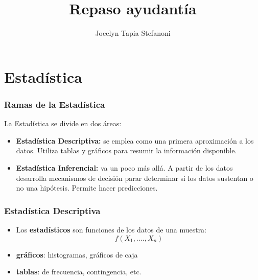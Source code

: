 \documentclass{beamer}
\title{ Repaso ayudantía}
\author{Jocelyn Tapia Stefanoni}
\institute[USM]
{Universidad Técnica Federico Santa María\\ %
	\medskip
	\textit{} %
	
}
\date{}
\begin{document}
	
\begin{frame}
	\titlepage %
\end{frame}
	
\section{Estadística}


\begin{frame}
\frametitle{Ramas de la  Estadística }
La Estadística se divide en dos
áreas:

\begin{itemize}
\item\textbf{{\color{blue} Estadística Descriptiva:}} se emplea como una primera aproximación a los datos. Utiliza tablas y gráficos para resumir la información disponible.
\item \textbf{{\color{blue} Estadística Inferencial:}} va un poco más allá. A partir de los datos desarrolla mecanismos de decisión parar determinar si los datos sustentan o no una hipótesis. Permite hacer predicciones. 
\end{itemize}

\end{frame}



\begin{frame}
\frametitle{ Estadística Descriptiva}

\begin{itemize}
\item Los \textbf{{\color{blue}estadísticos}} son funciones de los datos de una muestra:
$$f(X_1,....,X_n)$$
\item \textbf{gráficos}: histogramas, gráficos de caja
\item \textbf{tablas}: de frecuencia, contingencia, etc.
\end{itemize}
\end{frame}


\end{document}
